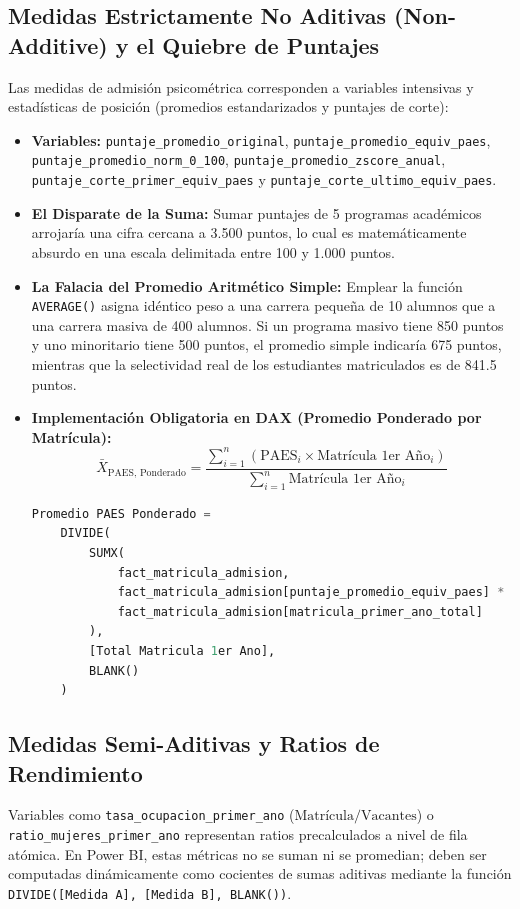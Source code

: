 \documentclass[11pt,a4paper]{article}
\begin{document}
\subsection{Medidas Estrictamente No Aditivas (Non-Additive) y el Quiebre de Puntajes}
Las medidas de admisión psicométrica corresponden a variables intensivas y estadísticas de posición (promedios estandarizados y puntajes de corte):
\begin{itemize}[leftmargin=*]
    \item \textbf{Variables:} \texttt{puntaje\_promedio\_original}, \texttt{puntaje\_promedio\_equiv\_paes}, \texttt{puntaje\_promedio\_norm\_0\_100}, \texttt{puntaje\_promedio\_zscore\_anual}, \texttt{puntaje\_corte\_primer\_equiv\_paes} y \texttt{puntaje\_corte\_ultimo\_equiv\_paes}.
    \item \textbf{El Disparate de la Suma:} Sumar puntajes de 5 programas académicos arrojaría una cifra cercana a 3.500 puntos, lo cual es matemáticamente absurdo en una escala delimitada entre 100 y 1.000 puntos.
    \item \textbf{La Falacia del Promedio Aritmético Simple:} Emplear la función \texttt{AVERAGE()} asigna idéntico peso a una carrera pequeña de 10 alumnos que a una carrera masiva de 400 alumnos. Si un programa masivo tiene 850 puntos y uno minoritario tiene 500 puntos, el promedio simple indicaría 675 puntos, mientras que la selectividad real de los estudiantes matriculados es de 841.5 puntos.
    \item \textbf{Implementación Obligatoria en DAX (Promedio Ponderado por Matrícula):}
    \begin{equation}
        \bar{X}_{\text{PAES, Ponderado}} = \frac{\sum_{i=1}^n (\text{PAES}_i \times \text{Matrícula 1er Año}_i)}{\sum_{i=1}^n \text{Matrícula 1er Año}_i}
    \end{equation}
    \begin{lstlisting}[language=SQL]
    Promedio PAES Ponderado = 
    DIVIDE(
        SUMX(
            fact_matricula_admision,
            fact_matricula_admision[puntaje_promedio_equiv_paes] * 
            fact_matricula_admision[matricula_primer_ano_total]
        ),
        [Total Matricula 1er Ano],
        BLANK()
    )
    \end{lstlisting}
\end{itemize}

\subsection{Medidas Semi-Aditivas y Ratios de Rendimiento}
Variables como \texttt{tasa\_ocupacion\_primer\_ano} ($\text{Matrícula} / \text{Vacantes}$) o \texttt{ratio\_mujeres\_primer\_ano} representan ratios precalculados a nivel de fila atómica. En Power BI, estas métricas no se suman ni se promedian; deben ser computadas dinámicamente como cocientes de sumas aditivas mediante la función \texttt{DIVIDE([Medida A], [Medida B], BLANK())}.
\end{document}
